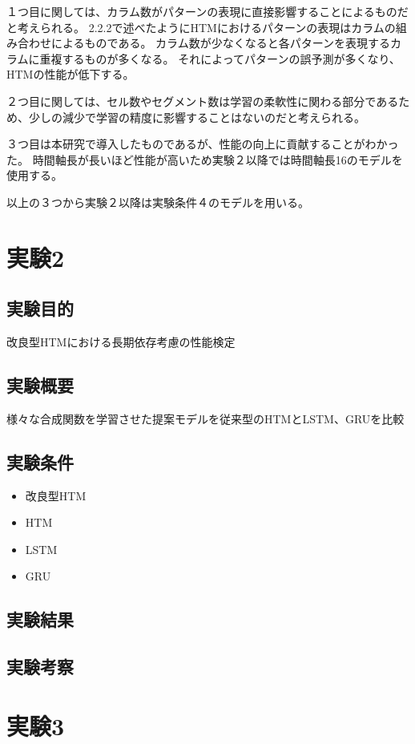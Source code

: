 １つ目に関しては、カラム数がパターンの表現に直接影響することによるものだと考えられる。
2.2.2で述べたようにHTMにおけるパターンの表現はカラムの組み合わせによるものである。
カラム数が少なくなると各パターンを表現するカラムに重複するものが多くなる。
それによってパターンの誤予測が多くなり、HTMの性能が低下する。

２つ目に関しては、セル数やセグメント数は学習の柔軟性に関わる部分であるため、少しの減少で学習の精度に影響することはないのだと考えられる。

３つ目は本研究で導入したものであるが、性能の向上に貢献することがわかった。
時間軸長が長いほど性能が高いため実験２以降では時間軸長16のモデルを使用する。

以上の３つから実験２以降は実験条件４のモデルを用いる。

\section{実験2}
\subsection{実験目的}
改良型HTMにおける長期依存考慮の性能検定

\subsection{実験概要}
様々な合成関数を学習させた提案モデルを従来型のHTMとLSTM、GRUを比較

\subsection{実験条件}

\begin{itemize}
  \item 改良型HTM
  \item HTM
  \item LSTM
  \item GRU
\end{itemize}

\subsection{実験結果}
\subsection{実験考察}
\section{実験3}
